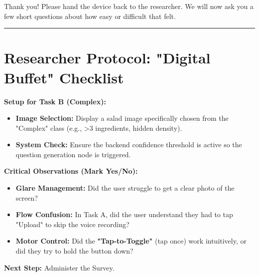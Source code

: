 Thank you! Please hand the device back to the researcher.
We will now ask you a few short questions about how easy or difficult that felt.
\vspace{1em}
\hrule
\vspace{1em}

\section*{Researcher Protocol: "Digital Buffet" Checklist}

\textbf{Setup for Task B (Complex):}

\begin{itemize}
    \item \textbf{Image Selection:} Display a salad image specifically chosen from the "Complex" class (e.g., >3 ingredients, hidden density).
    \item \textbf{System Check:} Ensure the backend confidence threshold is active so the question generation node is triggered.
\end{itemize}

\textbf{Critical Observations (Mark Yes/No):}

\begin{itemize}
    \item \textbf{Glare Management:} Did the user struggle to get a clear photo of the screen?
    \item \textbf{Flow Confusion:} In Task A, did the user understand they had to tap "Upload" to skip the voice recording?
    \item \textbf{Motor Control:} Did the \textbf{"Tap-to-Toggle"} (tap once) work intuitively, or did they try to hold the button down?
\end{itemize}

\textbf{Next Step:} Administer the Survey.
